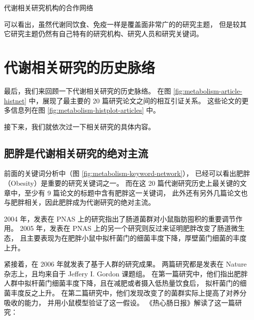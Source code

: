 \documentclass[]{ctexbook}
\begin{document}
\hypertarget{htmlwidget-2c437b5f7d314b5f0967}{}

\label{fig:metabolism-article-university-collaboration-network}代谢相关研究机构的合作网络

可以看出，虽然代谢同饮食、免疫一样是覆盖面非常广的的研究主题，
但是较其它研究主题仍然有自己特有的研究机构、研究人员和研究关键词。

\hypertarget{ux4ee3ux8c22ux76f8ux5173ux7814ux7a76ux7684ux5386ux53f2ux8109ux7edc}{%
\section{代谢相关研究的历史脉络}\label{ux4ee3ux8c22ux76f8ux5173ux7814ux7a76ux7684ux5386ux53f2ux8109ux7edc}}

最后，我们来回顾一下代谢相关研究的历史脉络。
在图 \ref{fig:metabolism-article-histnet} 中，展现了最主要的 20 篇研究论文之间的相互引证关系。
这些论文的更多信息列在图 \ref{fig:metabolism-histplot-articles} 中。

接下来，我们就依次过一下相关研究的具体内容。

\hypertarget{ux80a5ux80d6ux662fux4ee3ux8c22ux76f8ux5173ux7814ux7a76ux7684ux7eddux5bf9ux4e3bux6d41}{%
\subsection{肥胖是代谢相关研究的绝对主流}\label{ux80a5ux80d6ux662fux4ee3ux8c22ux76f8ux5173ux7814ux7a76ux7684ux7eddux5bf9ux4e3bux6d41}}

前面的关键词分析中（图 \ref{fig:metabolism-keyword-network}），
已经可以看出肥胖（Obesity）是重要的研究关键词之一。
而在这 20 篇代谢研究历史上最关键的文章中，至少有 9 篇论文的标题中含有肥胖这一关键词，
此外还有另外几篇论文也与肥胖相关，因此肥胖成为代谢研究的绝对主流。

2004 年，发表在 PNAS 上的研究指出了肠道菌群对小鼠脂肪囤积的重要调节作用\citep{backhedGutMicrobiotaEnvironmental2004}。
2005 年，发表在 PNAS 上的另一个研究则反过来证明肥胖改变了肠道微生态，
且主要表现为在肥胖小鼠中拟杆菌门的细菌丰度下降，厚壁菌门细菌的丰度上升\citep{leyObesityAltersGut2005}。

紧接着，在 2006 年就发表了基于人群的研究成果。
两篇研究都是发表在 Nature 杂志上，且均来自于 Jeffery I. Gordon 课题组。
在第一篇研究中，他们指出肥胖人群中拟杆菌门细菌丰度下降，且在减肥或者摄入低热量饮食后，
拟杆菌门的细菌丰度反之上升\citep{leyHumanGutMicrobes2006}。
在第二篇研究中，他们发现改变了的菌群实际上提高了对养分吸收的能力，
并用小鼠模型验证了这一假设\citep{turnbaughObesityassociatedGutMicrobiome2006a}。
《热心肠日报》解读了这一篇研究：
\end{document}
